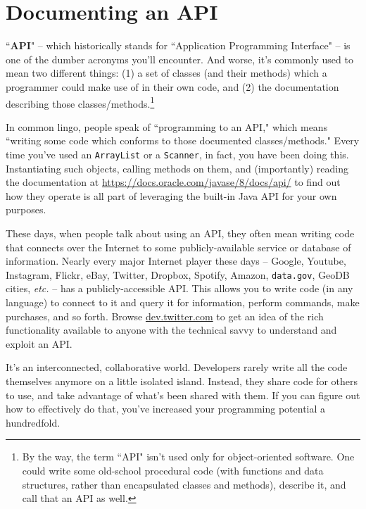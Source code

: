 

\chapter{Documenting an API}

``\textbf{API}" -- which historically stands for ``Application Programming
Interface" -- is one of the dumber acronyms you'll encounter. And worse, it's
commonly used to mean two different things: (1) a set of classes (and their
methods) which a programmer could make use of in their own code, and (2) the
documentation describing those classes/methods.\footnote{By the way, the term
``API" isn't used only for object-oriented software. One could write some
old-school procedural code (with functions and data structures, rather than
encapsulated classes and methods), describe it, and call that an API as well.}

In common lingo, people speak of ``programming to an API," which means
``writing some code which conforms to those documented classes/methods." Every
time you've used an \texttt{ArrayList} or a \texttt{Scanner}, in fact, you
have been doing this. Instantiating such objects, calling methods on them, and
(importantly) reading the documentation at
\url{https://docs.oracle.com/javase/8/docs/api/} to find out how they
operate is all part of leveraging the built-in Java API for your own purposes.

These days, when people talk about using an API, they often mean writing code
that connects over the Internet to some publicly-available service or database
of information. Nearly every major Internet player these days -- Google,
Youtube, Instagram, Flickr, eBay, Twitter, Dropbox, Spotify, Amazon,
\texttt{data.gov}, GeoDB cities, \textit{etc.} -- has a publicly-accessible
API. This allows you to write code (in any language) to connect to it and
query it for information, perform commands, make purchases, and so forth.
Browse \url{dev.twitter.com} to get an idea of the rich functionality
available to anyone with the technical savvy to understand and exploit an API.

It's an interconnected, collaborative world. Developers rarely write all the
code themselves anymore on a little isolated island. Instead, they share code
for others to use, and take advantage of what's been shared with them. If you
can figure out how to effectively do that, you've increased your programming
potential a hundredfold.

